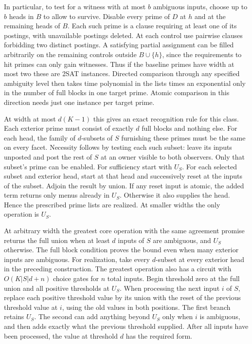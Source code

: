 In particular, to test for a witness with at most $b$
ambiguous inputs, choose up to $b$ heads in $B$ to allow to
survive. Disable every prime of $D$ at $h$ and at the
remaining heads of $B$. Each such prime is a clause requiring
at least one of its postings, with unavailable postings
deleted. At each control use pairwise clauses forbidding
two distinct postings. A satisfying partial assignment can
be filled arbitrarily on the remaining controls outside
$B\cup\{h\}$, since the requirements to hit primes can only
gain witnesses. Thus if the baseline primes have width at
most two these are 2SAT instances. Directed comparison
through any specified ambiguity level then takes time
polynomial in the lists times an exponential only in the
number of full blocks in one target prime. Atomic comparison
in this direction needs just one instance per target prime.

At width at most $d(K-1)$ this gives an exact recognition
rule for this class. Each exterior prime must consist of
exactly $d$ full blocks and nothing else. For each head, the
family of $d$-subsets of $S$ furnishing these primes must be
the same on every facet. Necessity follows by testing each
such subset: leave its inputs unposted and post the rest of
$S$ at an owner visible to both observers. Only that subset's
prime can be enabled. For sufficiency start with $U_S$.
For each selected subset and exterior head, start at that head
and successively reset at the inputs of the subset. Adjoin the
result by union. If any reset input is atomic, the added term
returns only menus already in $U_S$. Otherwise it also supplies
the head. Hence the prescribed prime lists are realized.
At smaller widths the only operation is $U_S$.

At arbitrary width the greatest core operation with the same
agreement promise returns the full union when at least $d$
inputs of $S$ are ambiguous, and $U_S$ otherwise. The full
block condition proves the bound even when many exterior
inputs are ambiguous. For realization, take every $d$-subset
at every exterior head in the preceding construction.
The greatest operation also has a circuit with
$O(K|S|d+n)$ choice gates for $n$ total inputs. Begin threshold zero
at the full union and all positive thresholds at $U_S$.
When processing the next input $i$ of $S$, replace each
positive threshold value by its union with the reset of the
previous threshold value at $i$, using the old values in
both positions. The first branch retains $U_S$. The second
can add anything beyond $U_S$ only when $i$ is ambiguous,
and then adds exactly what the previous threshold supplied.
After all inputs have been processed, the value at threshold
$d$ has the required form.


